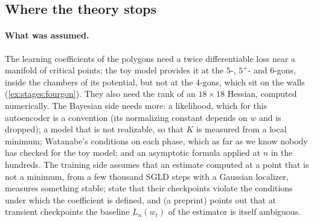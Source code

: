 \begin{refsection}

\section{Where the theory stops}\label{sec:stages:stops}

\paragraph{What was assumed.} The learning coefficients of the polygons need a twice differentiable loss near a manifold of critical points; the toy model provides it at the $5$-, $5^+$- and $6$-gons, inside the chambers of its potential, but not at the $4$-gons, which sit on the walls (\cref{ex:stages:fourgon}). They also need the rank of an $18\times18$ Hessian, computed numerically. The Bayesian side needs more: a likelihood, which for this autoencoder is a convention (its normalizing constant depends on $w$ and is dropped); a model that is not realizable, so that $K$ is measured from a local minimum; Watanabe's conditions on each phase, which as far as we know nobody has checked for the toy model; and an asymptotic formula applied at $n$ in the hundreds. The training side assumes that an estimate computed at a point that is not a minimum, from a few thousand SGLD steps with a Gaussian localizer, measures something stable; \textcite{HooglandEtAl2025} state that their checkpoints violate the conditions under which the coefficient is defined, and \textcite{Cai2026} (a preprint) points out that at transient checkpoints the baseline $L_n(w_t)$ of the estimator is itself ambiguous.


\end{refsection}
